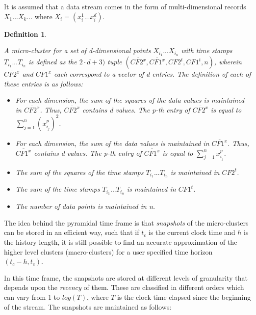 \documentclass[10pt, conference, compsocconf]{IEEEtran}
\newtheorem{definition}[theorem]{Definition}
\begin{document}
It is assumed that a data stream comes in the form of multi-dimensional records $\bar X_1 ... \bar X_k ...$ where $\bar X_i = (x^1_i ... x^d_i)$.

\begin{definition}\cite{clustreamOrig}

A micro-cluster for a set of d-dimensional points $X_{i_1} ...X_{i_n}$ with time stamps
$T_{i_1} ...T_{i_n}$ is defined as the $2 \cdot d + 3)$ tuple $(\overline{CF2^x},\overline{CF1^x},CF2^t,CF1^t,n)$, wherein $\overline{CF2^x}$ and $\overline{CF1^x}$ each correspond to a vector of d entries. The definition of each of these entries is as follows: 

\begin{itemize}
 \item For each dimension, the sum of the squares of the data values is maintained in $\overline{CF2^x}$. Thus, $\overline{CF2^x}$ contains d values. The p-th entry of $\overline{CF2^x}$ is equal to $\sum^n_{j=1} (x^p_{i_j})^2$. 
 \item For each dimension, the sum of the data values is maintained in $\overline{CF1^x}$. Thus, $\overline{CF1^x}$ contains d values. The p-th entry of $\overline{CF1^x}$ is equal to $\sum^n_{j=1} x^p_{i_j}$.
 \item The sum of the squares of the time stamps $T_{i_1} ...T_{i_n}$ is maintained in $CF2^t$.
 \item The sum of the time stamps $T_{i_1} ...T_{i_n}$ is maintained in $CF1^t$.
 \item The number of data points is maintained in n.
\end{itemize}

\end{definition}

The idea behind the pyramidal time frame is that \textit{snapshots} of the micro-clusters can be stored in an efficient way, such that if $t_c$ is the current clock time and $h$ is the history length, it is still possible to find an accurate approximation of the higher level clusters (macro-clusters) for a user specified time horizon $(t_c - h, t_c)$.

In this time frame, the snapshots are stored at different levels of granularity that depends upon the \textit{recency} of them. These are classified in different orders which can vary from 1 to $log(T)$, where $T$ is the clock time elapsed since the beginning of the stream. The snapshots are maintained as follows:
\end{document}
